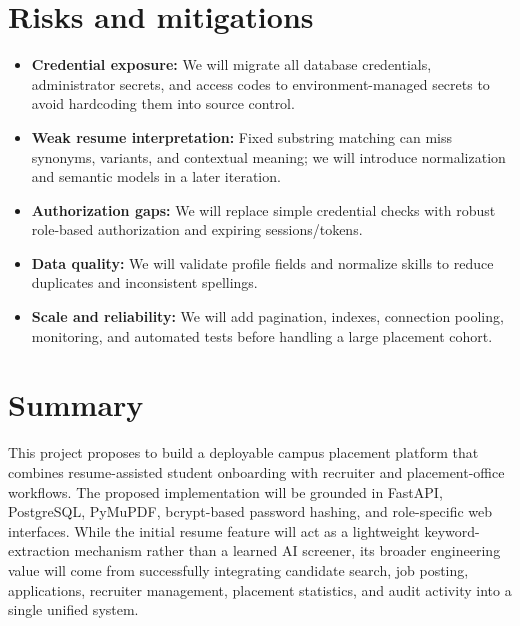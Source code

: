 \documentclass[11pt,a4paper]{article}
\begin{document}
\section{Risks and mitigations}
\begin{itemize}[leftmargin=0.7cm]
    \item \textbf{Credential exposure:} We will migrate all database credentials, administrator secrets, and access codes to environment-managed secrets to avoid hardcoding them into source control.
    \item \textbf{Weak resume interpretation:} Fixed substring matching can miss synonyms, variants, and contextual meaning; we will introduce normalization and semantic models in a later iteration.
    \item \textbf{Authorization gaps:} We will replace simple credential checks with robust role-based authorization and expiring sessions/tokens.
    \item \textbf{Data quality:} We will validate profile fields and normalize skills to reduce duplicates and inconsistent spellings.
    \item \textbf{Scale and reliability:} We will add pagination, indexes, connection pooling, monitoring, and automated tests before handling a large placement cohort.
\end{itemize}

\section{Summary}
This project proposes to build a deployable campus placement platform that combines resume-assisted student onboarding with recruiter and placement-office workflows. The proposed implementation will be grounded in FastAPI, PostgreSQL, PyMuPDF, bcrypt-based password hashing, and role-specific web interfaces. While the initial resume feature will act as a lightweight keyword-extraction mechanism rather than a learned AI screener, its broader engineering value will come from successfully integrating candidate search, job posting, applications, recruiter management, placement statistics, and audit activity into a single unified system.
\end{document}
